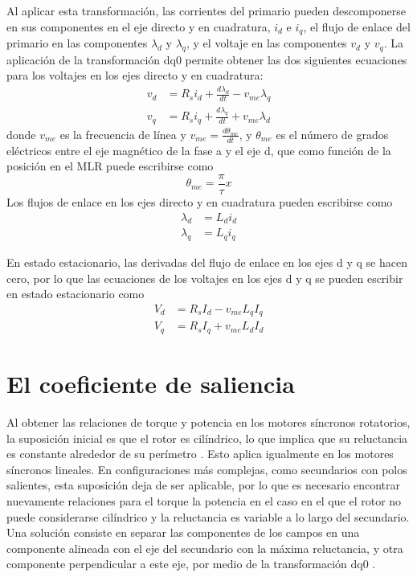 Al aplicar esta transformación, las corrientes del primario pueden descomponerse en sus componentes en el eje directo y en cuadratura, $i_d$ e $i_q$, el flujo de enlace del primario en las componentes $\lambda_d$ y $\lambda_q$, y el voltaje en las componentes $v_d$ y $v_q$. La aplicación de la transformación dq0 permite obtener las dos siguientes ecuaciones para los voltajes en los ejes directo y en cuadratura:
\begin{align*}
v_d &= R_s i_d + \frac{d\lambda_d}{dt} - v_{me}\lambda_q\\
v_q &= R_s i_q + \frac{d\lambda_q}{dt} + v_{me}\lambda_d
\end{align*}
donde $v_{me}$ es la frecuencia de línea y $v_{me} = \frac{d\theta_{me}}{dt}$, y $\theta_{me}$ es el número de grados eléctricos entre el eje magnético de la fase a y el eje d, que como función de la posición en el MLR puede escribirse como
\begin{equation*}
\theta_{me} = \frac{\pi}{\tau}x
\end{equation*}
Los flujos de enlace en los ejes directo y en cuadratura pueden escribirse como
\begin{align*}
\lambda_d &= L_d i_d\\
\lambda_q &= L_q i_q
\end{align*}

En estado estacionario, las derivadas del flujo de enlace en los ejes d y q se hacen cero, por lo que las ecuaciones de los voltajes en los ejes d y q se pueden escribir en estado estacionario como
\begin{align}
V_d &= R_s I_d - v_{me}L_q I_q\\
V_q &= R_s I_q + v_{me}L_d I_d
\end{align}

\section{El coeficiente de saliencia}
Al obtener las relaciones de torque y potencia en los motores síncronos rotatorios, la suposición inicial es que el rotor es cilíndrico, lo que implica que su reluctancia es constante alrededor de su perímetro \cite{chapman2003}. Esto aplica igualmente en los motores síncronos lineales. En configuraciones más complejas, como secundarios con polos salientes, esta suposición deja de ser aplicable, por lo que es necesario encontrar nuevamente relaciones para el torque la potencia en el caso en el que el rotor no puede considerarse cilíndrico y la reluctancia es variable a lo largo del secundario. Una solución consiste en separar las componentes de los campos en una componente alineada con el eje del secundario con la máxima reluctancia, y otra componente perpendicular a este eje, por medio de la transformación dq0 \cite{gieras2000}.

